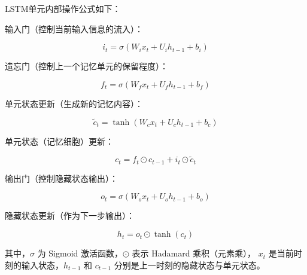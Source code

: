 LSTM单元内部操作公式如下：


输入门（控制当前输入信息的流入）：

\begin{equation}
i_t = \sigma(W_i x_t + U_i h_{t-1} + b_i)
\end{equation}

遗忘门（控制上一个记忆单元的保留程度）：

\begin{equation}
f_t = \sigma(W_f x_t + U_f h_{t-1} + b_f)
\end{equation}

单元状态更新（生成新的记忆内容）：

\begin{equation}
\tilde{c}_t = \tanh(W_c x_t + U_c h_{t-1} + b_c)
\end{equation}

单元状态（记忆细胞）更新：

\begin{equation}
c_t = f_t \odot c_{t-1} + i_t \odot \tilde{c}_t
\end{equation}

输出门（控制隐藏状态输出）：

\begin{equation}
o_t = \sigma(W_o x_t + U_o h_{t-1} + b_o)
\end{equation}

隐藏状态更新（作为下一步输出）：

\begin{equation}
h_t = o_t \odot \tanh(c_t)
\end{equation}

其中，$\sigma$ 为 Sigmoid 激活函数，$\odot$ 表示 Hadamard 乘积（元素乘），
$x_t$ 是当前时刻的输入状态，$h_{t-1}$ 和 $c_{t-1}$ 分别是上一时刻的隐藏状态与单元状态。


